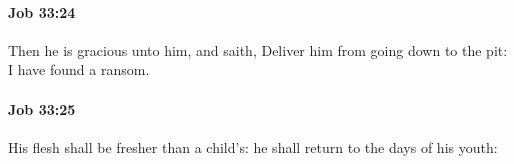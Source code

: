 		\paragraph{Job 33:24} %
			\label{JOB-33-24}

			Then he is gracious unto him, and saith, Deliver him from going down to the pit: I have found a ransom.


		\paragraph{Job 33:25} %
			\label{JOB-33-25}

			His flesh shall be fresher than a child’s: he shall return to the days of his youth:


